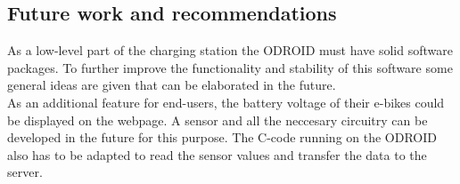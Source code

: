 \subsection{Future work and recommendations}\label{sec:future}
As a low-level part of the charging station the ODROID must have solid software packages. To further improve the functionality and stability of this software some general ideas are given that can be elaborated in the future.\\



As an additional feature for end-users, the battery voltage of their e-bikes could be displayed on the webpage. A sensor and all the neccesary circuitry can be developed in the future for this purpose. The C-code running on the ODROID also has to be adapted to read the sensor values and transfer the data to the server.\\


